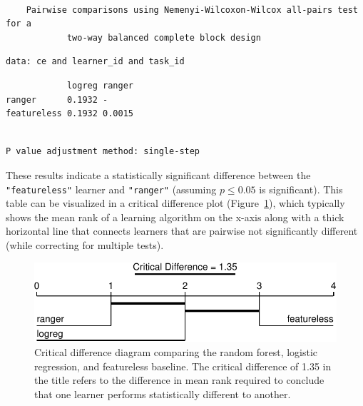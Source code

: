 \begin{verbatim}

    Pairwise comparisons using Nemenyi-Wilcoxon-Wilcox all-pairs test for a
    		two-way balanced complete block design
\end{verbatim}

\begin{verbatim}
data: ce and learner_id and task_id
\end{verbatim}

\begin{verbatim}
            logreg ranger
ranger      0.1932 -     
featureless 0.1932 0.0015
\end{verbatim}

\begin{verbatim}

P value adjustment method: single-step
\end{verbatim}

These results indicate a statistically significant difference between
the \texttt{"featureless"} learner and \texttt{"ranger"} (assuming
\(p\leq0.05\) is significant). This table can be visualized in a
critical difference plot (Figure~\ref{fig-lsb-cd}), which typically
shows the mean rank of a learning algorithm on the x-axis along with a
thick horizontal line that connects learners that are pairwise not
significantly different (while correcting for multiple tests).

\begin{Shaded}
\begin{Highlighting}[]
 \NormalTok{, } \SpecialCharTok{/}\NormalTok{)}
\end{Highlighting}
\end{Shaded}

\begin{figure}[H]

{\centering \includegraphics[width=1\textwidth,height=\textheight]{chapters/chapter11/large-scale_benchmarking_files/figure-pdf/fig-lsb-cd-1.pdf}

}

\caption{\label{fig-lsb-cd}Critical difference diagram comparing the
random forest, logistic regression, and featureless baseline. The
critical difference of 1.35 in the title refers to the difference in
mean rank required to conclude that one learner performs statistically
different to another.}

\end{figure}

